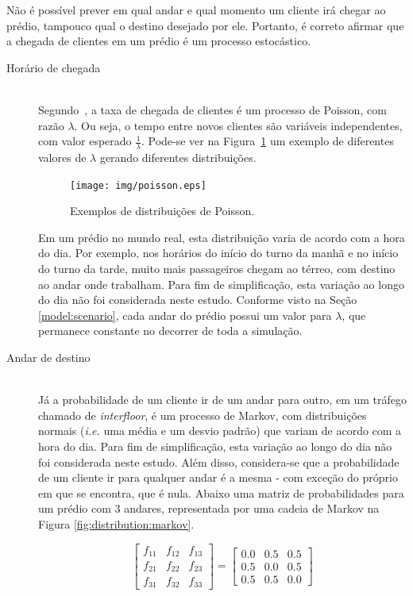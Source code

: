 Não é possível prever em qual andar e qual momento um cliente irá chegar ao
prédio, tampouco qual o destino desejado por ele. Portanto, é correto afirmar
que a chegada de clientes em um prédio é um processo estocástico.

\begin{description}

\item[Horário de chegada] \hfill \\
Segundo~\cite{Ross:2006:IPM:1197141}, a taxa de chegada de clientes é um
processo de Poisson, com razão $\lambda$. Ou seja, o tempo entre novos clientes
são variáveis independentes, com valor esperado $\frac{1}{\lambda}$. Pode-se ver
na Figura~\ref{fig:distribution:poisson} um exemplo de diferentes valores de
$\lambda$ gerando diferentes distribuições.

\begin{figure}[htb!]
  \centering
  \texttt{[image: img/poisson.eps]}
  \caption{Exemplos de distribuições de Poisson.}
\label{fig:distribution:poisson}
\end{figure}

Em um prédio no mundo real, esta distribuição varia de acordo com a hora do dia.
Por exemplo, nos horários do início do turno da manhã e no início do turno da
tarde, muito mais passageiros chegam ao térreo, com destino ao andar onde
trabalham. Para fim de simplificação, esta variação ao longo do dia não foi
considerada neste estudo. Conforme visto na Seção \ref{model:scenario}, cada
andar do prédio possui um valor para $\lambda$, que permanece constante no
decorrer de toda a simulação.

\item[Andar de destino] \hfill \\
Já a probabilidade de um cliente ir de um andar para outro, em um tráfego
chamado de \textit{interfloor}, é um processo de Markov, com distribuições
normais (\textit{i.e.} uma média e um desvio padrão) que variam de acordo com a
hora do dia. Para fim de simplificação, esta variação ao longo do dia não foi
considerada neste estudo. Além disso, considera-se que a probabilidade de um
cliente ir para qualquer andar é a mesma - com exceção do próprio em que se
encontra, que é nula. Abaixo uma matriz de probabilidades para um prédio com 3
andares, representada por uma cadeia de Markov na Figura
\ref{fig:distribution:markov}.

\[
  \begin{bmatrix}
    f_{11} & f_{12} & f_{13}  \\
    f_{21} & f_{22} & f_{23}  \\
    f_{31} & f_{32} & f_{33}
  \end{bmatrix} = \begin{bmatrix}
    0.0 & 0.5 & 0.5  \\
    0.5 & 0.0 & 0.5  \\
    0.5 & 0.5 & 0.0
  \end{bmatrix}
\]


\end{description}
